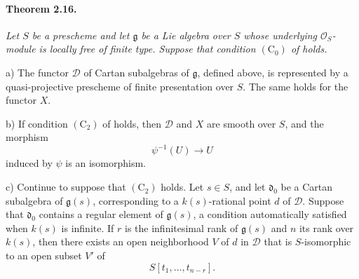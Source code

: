 \paragraph{\textbf{Theorem 2.16.}}
{\itshape Let \(S\) be a prescheme and let \(\mathfrak g\) be a Lie
algebra over \(S\) whose underlying \(\mathcal O_S\)-module is
locally free of finite type. Suppose that condition
\((\mathrm C_0)\) of  holds.

\smallskip
\noindent
\textup{a)}
The functor \(\mathcal D\) of Cartan subalgebras of
\(\mathfrak g\), defined above, is represented by a
quasi-projective prescheme of finite presentation over \(S\).
The same holds for the functor \(X\).

\smallskip
\noindent
\textup{b)}
If condition \((\mathrm C_2)\) of  holds, then
\(\mathcal D\) and \(X\) are smooth over \(S\), and the morphism
\[
  \psi^{-1}(U)\longrightarrow U
\]
induced by \(\psi\) is an isomorphism.

\smallskip
\noindent
\textup{c)}
Continue to suppose that \((\mathrm C_2)\) holds. Let \(s\in S\),
and let \(\mathfrak d_0\) be a Cartan subalgebra of
\(\mathfrak g(s)\), corresponding to a \(k(s)\)-rational point
\(d\) of \(\mathcal D\). Suppose that \(\mathfrak d_0\) contains a
regular element of \(\mathfrak g(s)\), a condition automatically
satisfied when \(k(s)\) is infinite. If \(r\) is the infinitesimal
rank of \(\mathfrak g(s)\) and \(n\) its rank over \(k(s)\), then
there exists an open neighborhood \(V\) of \(d\) in
\(\mathcal D\) that is \(S\)-isomorphic to an open subset \(V'\)
of
\[
  S[t_1,\ldots,t_{n-r}].
\]}
